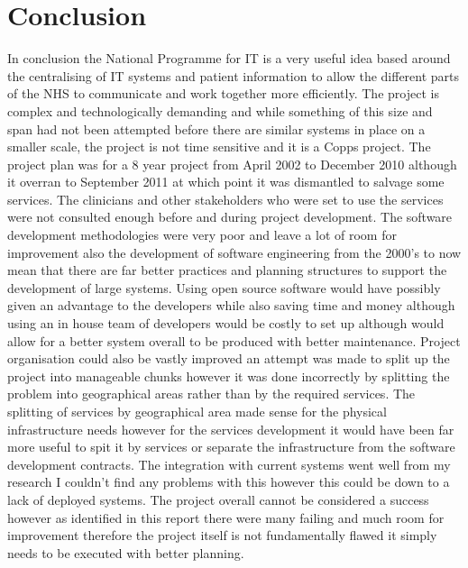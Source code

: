 \documentclass[a4paper,12pt]{scrartcl}
\begin{document}
	\section{Conclusion}
	{
		In conclusion the National Programme for IT is a very useful idea based around the centralising of IT systems and patient information to allow the different parts of the NHS to communicate and work together more efficiently. The project is complex and technologically demanding and while something of this size and span had not been attempted before there are similar systems in place on a smaller scale, the project is not time sensitive and it is a Copps project. The project plan was for a 8 year project from April 2002 to December 2010 although it overran to September 2011 at which point it was dismantled to salvage some services. The clinicians and other stakeholders who were set to use the services were not consulted enough before and during project development. The software development methodologies were very poor and leave a lot of room for improvement also the development of software engineering from the 2000's to now mean that there are far better practices and planning structures to support the development of large systems. Using open source software would have possibly given an advantage to the developers while also saving time and money although using an in house team of developers would be costly to set up although would allow for a better system overall to be produced with better maintenance. Project organisation could also be vastly improved an attempt was made to split up the project into manageable chunks however it was done incorrectly by splitting the problem into geographical areas rather than by the required services. The splitting of services by geographical area made sense for the physical infrastructure needs however for the services development it would have been far more useful to spit it by services or separate the infrastructure from the software development contracts. The integration with current systems went well from my research I couldn't find any problems with this however this could be down to a lack of deployed systems. The project overall cannot be considered a success however as identified in this report there were many failing and much room for improvement therefore the project itself is not fundamentally flawed it simply needs to be executed with better planning.
	}
	
	
	\newpage
	
	\printbibliography[heading=bibintoc,title=References]
\end{document}
